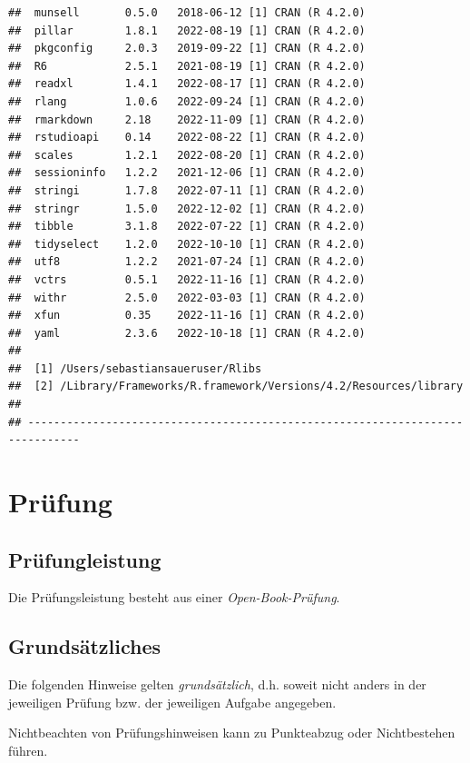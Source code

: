 \documentclass[
  a4paper,
  DIV=11]{scrreprt}
\theoremstyle{definition}
\theoremstyle{remark}
\begin{document}
\begin{verbatim}
##  munsell       0.5.0   2018-06-12 [1] CRAN (R 4.2.0)
##  pillar        1.8.1   2022-08-19 [1] CRAN (R 4.2.0)
##  pkgconfig     2.0.3   2019-09-22 [1] CRAN (R 4.2.0)
##  R6            2.5.1   2021-08-19 [1] CRAN (R 4.2.0)
##  readxl        1.4.1   2022-08-17 [1] CRAN (R 4.2.0)
##  rlang         1.0.6   2022-09-24 [1] CRAN (R 4.2.0)
##  rmarkdown     2.18    2022-11-09 [1] CRAN (R 4.2.0)
##  rstudioapi    0.14    2022-08-22 [1] CRAN (R 4.2.0)
##  scales        1.2.1   2022-08-20 [1] CRAN (R 4.2.0)
##  sessioninfo   1.2.2   2021-12-06 [1] CRAN (R 4.2.0)
##  stringi       1.7.8   2022-07-11 [1] CRAN (R 4.2.0)
##  stringr       1.5.0   2022-12-02 [1] CRAN (R 4.2.0)
##  tibble        3.1.8   2022-07-22 [1] CRAN (R 4.2.0)
##  tidyselect    1.2.0   2022-10-10 [1] CRAN (R 4.2.0)
##  utf8          1.2.2   2021-07-24 [1] CRAN (R 4.2.0)
##  vctrs         0.5.1   2022-11-16 [1] CRAN (R 4.2.0)
##  withr         2.5.0   2022-03-03 [1] CRAN (R 4.2.0)
##  xfun          0.35    2022-11-16 [1] CRAN (R 4.2.0)
##  yaml          2.3.6   2022-10-18 [1] CRAN (R 4.2.0)
## 
##  [1] /Users/sebastiansaueruser/Rlibs
##  [2] /Library/Frameworks/R.framework/Versions/4.2/Resources/library
## 
## ------------------------------------------------------------------------------
\end{verbatim}


\hypertarget{pruxfcfung}{%
\chapter{Prüfung}\label{pruxfcfung}}

\hypertarget{pruxfcfungleistung}{%
\section{Prüfungleistung}\label{pruxfcfungleistung}}

Die Prüfungsleistung besteht aus einer \emph{Open-Book-Prüfung}.

\hypertarget{grundsuxe4tzliches}{%
\section{Grundsätzliches}\label{grundsuxe4tzliches}}

Die folgenden Hinweise gelten \emph{grundsätzlich}, d.h. soweit nicht
anders in der jeweiligen Prüfung bzw. der jeweiligen Aufgabe angegeben.

Nichtbeachten von Prüfungshinweisen kann zu Punkteabzug oder
Nichtbestehen führen.
\end{document}
